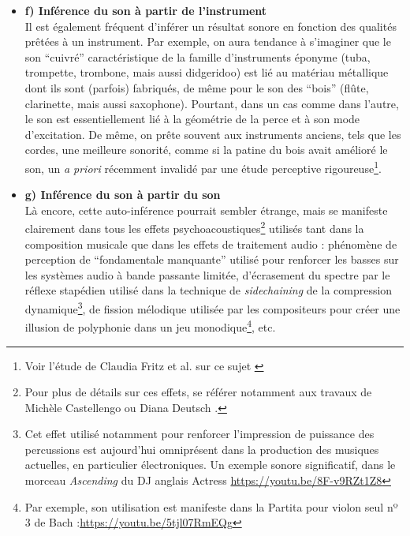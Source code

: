 \begin{itemize}[noitemsep]
	\item \textbf{f) Inférence du son à partir de l'instrument}\\
	Il est également fréquent d'inférer un résultat sonore en fonction des qualités prêtées à un instrument. Par exemple, on aura tendance à s'imaginer que le son ``cuivré'' caractéristique de la famille d'instruments éponyme (tuba, trompette, trombone, mais aussi didgeridoo) est lié au matériau métallique dont ils sont (parfois) fabriqués, de même pour le son des ``bois'' (flûte, clarinette, mais aussi saxophone). Pourtant, dans un cas comme dans l'autre, le son est essentiellement lié à la géométrie de la perce et à son mode d'excitation. De même, on prête souvent aux instruments anciens, tels que les cordes, une meilleure sonorité, comme si la patine du bois avait amélioré le son, un \textit{a priori} récemment invalidé par une étude perceptive rigoureuse\footnote{Voir l'étude de Claudia Fritz et al. sur ce sujet \cite{fritz_listener_2017}}.

	\item \textbf{g) Inférence du son à partir du son}\\
	Là encore, cette auto-inférence pourrait sembler étrange, mais se manifeste clairement dans tous les effets psychoacoustiques\footnote{Pour plus de détails sur ces effets, se référer notamment aux travaux de Michèle Castellengo \cite{castellengo_ecoute_2015} ou Diana Deutsch \cite{deutsch_psychology_2013}.} utilisés tant dans la composition musicale que dans les effets de traitement audio : phénomène de perception de ``fondamentale manquante'' utilisé pour renforcer les basses sur les systèmes audio à bande passante limitée, d'écrasement du spectre par le réflexe stapédien utilisé dans la technique de \textit{sidechaining} de la compression dynamique\footnote{\label{fn:gesture:sidechain}Cet effet utilisé notamment pour renforcer l'impression de puissance des percussions est aujourd'hui omniprésent dans la production des musiques actuelles, en particulier électroniques. Un exemple sonore significatif, dans le morceau \textit{Ascending} du \gls{DJ} anglais Actress \url{https://youtu.be/8F-v9RZt1Z8}}, de fission mélodique utilisée par les compositeurs pour créer une illusion de polyphonie dans un jeu monodique\footnote{Par exemple, son utilisation est manifeste dans la Partita pour violon seul nº 3 de Bach :\url{https://youtu.be/5tjl07RmEQg}}, etc.


\end{itemize}
